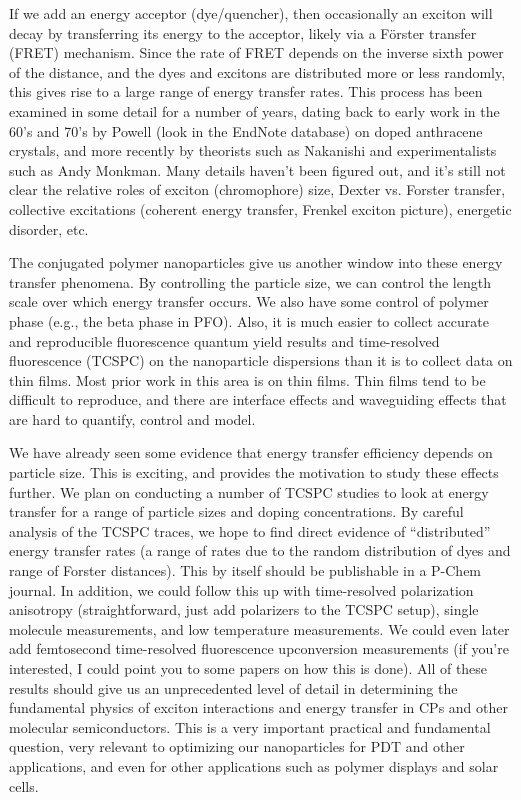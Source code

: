 \documentclass[12pt]{article}
\begin{document}
If we add an energy acceptor (dye/quencher), then occasionally an
exciton will decay by transferring its energy to the acceptor, likely
via a F\" orster transfer (FRET) mechanism.  Since the rate of FRET
depends on the inverse sixth power of the distance, and the dyes and
excitons are distributed more or less randomly, this gives rise to a
large range of energy transfer rates.  This process has been examined
in some detail for a number of years, dating back to early work in the
60's and 70's by Powell (look in the EndNote database) on doped
anthracene crystals, and more recently by theorists such as Nakanishi
and experimentalists such as Andy Monkman.  Many details haven't been
figured out, and it's still not clear the relative roles of exciton
(chromophore) size, Dexter vs. Forster transfer, collective
excitations (coherent energy transfer, Frenkel exciton picture),
energetic disorder, etc.

The conjugated polymer nanoparticles give us another window into these
energy transfer phenomena.  By controlling the particle size, we can
control the length scale over which energy transfer occurs.  We also
have some control of polymer phase (e.g., the beta phase in PFO).
Also, it is much easier to collect accurate and reproducible
fluorescence quantum yield results and time-resolved fluorescence
(TCSPC) on the nanoparticle dispersions than it is to collect data on
thin films.  Most prior work in this area is on thin films.  Thin
films tend to be difficult to reproduce, and there are interface
effects and waveguiding effects that are hard to quantify, control and
model.

We have already seen some evidence that energy transfer efficiency
depends on particle size.  This is exciting, and provides the
motivation to study these effects further.  We plan on conducting a
number of TCSPC studies to look at energy transfer for a range of
particle sizes and doping concentrations.  By careful analysis of the
TCSPC traces, we hope to find direct evidence of ``distributed''
energy transfer rates (a range of rates due to the random distribution
of dyes and range of Forster distances).  This by itself should be
publishable in a P-Chem journal.  In addition, we could follow this up
with time-resolved polarization anisotropy (straightforward, just add
polarizers to the TCSPC setup), single molecule measurements, and low
temperature measurements.  We could even later add femtosecond
time-resolved fluorescence upconversion measurements (if you're
interested, I could point you to some papers on how this is done).  All
of these results should give us an unprecedented level of detail in
determining the fundamental physics of exciton interactions and energy
transfer in CPs and other molecular semiconductors.  This is a very
important practical and fundamental question, very relevant to
optimizing our nanoparticles for PDT and other applications, and even
for other applications such as polymer displays and solar cells.
\end{document}
